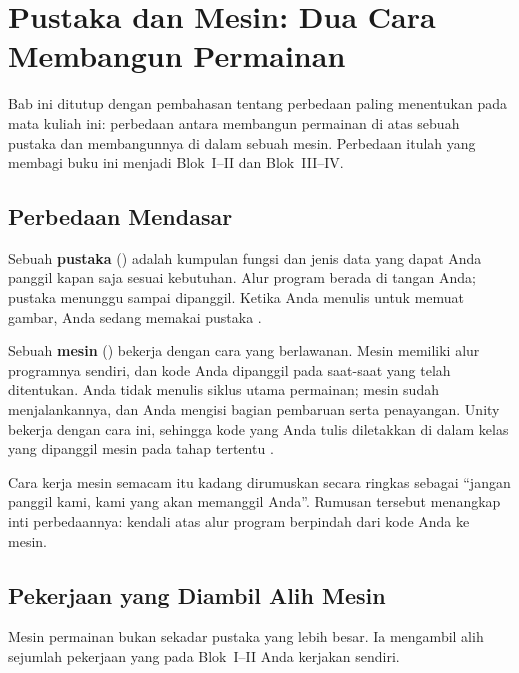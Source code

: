 \section{Pustaka dan Mesin: Dua Cara Membangun Permainan}
\label{sec:pustaka-mesin}

Bab ini ditutup dengan pembahasan tentang perbedaan paling menentukan pada
mata kuliah ini: perbedaan antara membangun permainan di atas sebuah pustaka
dan membangunnya di dalam sebuah mesin. Perbedaan itulah yang membagi buku ini
menjadi Blok~I--II dan Blok~III--IV.

\subsection{Perbedaan Mendasar}

Sebuah \textbf{pustaka} () adalah kumpulan fungsi dan jenis
data yang dapat Anda panggil kapan saja sesuai kebutuhan. Alur program berada
di tangan Anda; pustaka menunggu sampai dipanggil. Ketika Anda menulis
 untuk memuat gambar, Anda sedang memakai pustaka
\cite{pygame-docs}.

Sebuah \textbf{mesin} () bekerja dengan cara yang berlawanan.
Mesin memiliki alur programnya sendiri, dan kode Anda dipanggil pada
saat-saat yang telah ditentukan. Anda tidak menulis siklus utama permainan;
mesin sudah menjalankannya, dan Anda mengisi bagian pembaruan serta
penayangan. Unity bekerja dengan cara ini, sehingga kode yang Anda tulis
diletakkan di dalam kelas yang dipanggil mesin pada tahap tertentu
\cite{unity-leveldesign,unity-learn}.

Cara kerja mesin semacam itu kadang dirumuskan secara ringkas sebagai
``jangan panggil kami, kami yang akan memanggil Anda''. Rumusan tersebut
menangkap inti perbedaannya: kendali atas alur program berpindah dari kode Anda
ke mesin.

\subsection{Pekerjaan yang Diambil Alih Mesin}

Mesin permainan bukan sekadar pustaka yang lebih besar. Ia mengambil alih
sejumlah pekerjaan yang pada Blok~I--II Anda kerjakan sendiri.

